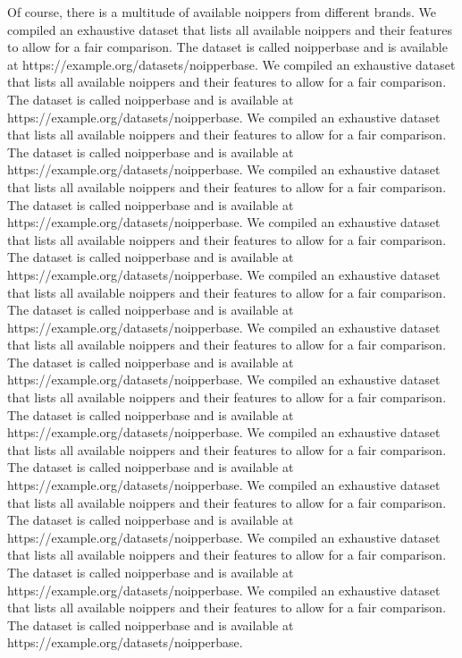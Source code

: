 Of course, there is a multitude of available noippers from different brands.
We compiled an exhaustive dataset that lists all available noippers and their features to allow for a fair comparison. The dataset is called noipperbase and is available at https://example.org/datasets/noipperbase.
We compiled an exhaustive dataset that lists all available noippers and their features to allow for a fair comparison. The dataset is called noipperbase and is available at https://example.org/datasets/noipperbase.
We compiled an exhaustive dataset that lists all available noippers and their features to allow for a fair comparison. The dataset is called noipperbase and is available at https://example.org/datasets/noipperbase.
We compiled an exhaustive dataset that lists all available noippers and their features to allow for a fair comparison. The dataset is called noipperbase and is available at https://example.org/datasets/noipperbase.
We compiled an exhaustive dataset that lists all available noippers and their features to allow for a fair comparison. The dataset is called noipperbase and is available at https://example.org/datasets/noipperbase.
We compiled an exhaustive dataset that lists all available noippers and their features to allow for a fair comparison. The dataset is called noipperbase and is available at https://example.org/datasets/noipperbase.
We compiled an exhaustive dataset that lists all available noippers and their features to allow for a fair comparison. The dataset is called noipperbase and is available at https://example.org/datasets/noipperbase.
We compiled an exhaustive dataset that lists all available noippers and their features to allow for a fair comparison. The dataset is called noipperbase and is available at https://example.org/datasets/noipperbase.
We compiled an exhaustive dataset that lists all available noippers and their features to allow for a fair comparison. The dataset is called noipperbase and is available at https://example.org/datasets/noipperbase.
We compiled an exhaustive dataset that lists all available noippers and their features to allow for a fair comparison. The dataset is called noipperbase and is available at https://example.org/datasets/noipperbase.
We compiled an exhaustive dataset that lists all available noippers and their features to allow for a fair comparison. The dataset is called noipperbase and is available at https://example.org/datasets/noipperbase.
We compiled an exhaustive dataset that lists all available noippers and their features to allow for a fair comparison. The dataset is called noipperbase and is available at https://example.org/datasets/noipperbase.
